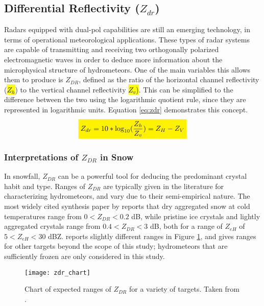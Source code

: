 \subsection{Differential Reflectivity ($Z_{dr}$)}
Radars equipped with dual-pol capabilities are still an emerging technology, in terms of operational meteorological applications. These
types of radar systems are capable of transmitting and receiving two orthogonally polarized electromagnetic waves in order to deduce more information about
the microphysical structure of hydrometeors. One of the main variables this allows them to produce is $Z_{DR}$, defined as the ratio of the horizontal
channel reflectivity (\hl{$Z_h$}) to the vertical channel reflectivity \hl{$Z_{v}$)}. This can be simplified to the difference between the two using the
logarithmic
quotient rule, since they are represented in logarithmic units. Equation \ref{eq:zdr} demonstrates this concept.
\begin{equation}\label{eq:zdr}
\mathcolorbox{yellow}{Z_{dr} = 10 * \log_{10}(\frac{Z_h}{Z_v}) = Z_H - Z_V}
\end{equation}
\subsubsection{Interpretations of $Z_{DR}$ in Snow}
In snowfall, $Z_{DR}$ can be a powerful tool for deducing the predominant crystal habit and type. Ranges of $Z_{DR}$ are typically given in the literature for characterizing hydrometeors, and vary due to their semi-empirical nature. The most widely cited synthesis paper by \citet{Straka2000} reports that dry aggregated snow at cold temperatures range from $0 < Z_{DR} < 0.2$ dB, while pristine ice crystals and lightly aggregated crystals range from $0.4 < Z_{DR} < 3$ dB, both for a range of $Z_{eH}$ of $5 < Z_{eH} < 30$ dBZ. \citet{Fabry2015} reports slightly different ranges in Figure \ref{zdr_chart}, and gives ranges for other targets beyond the scope of this study; hydrometeors that are sufficiently frozen are only considered in this study.
\begin{figure}[H]
\texttt{[image: zdr\_chart]}
\caption{Chart of expected ranges of $Z_{DR}$ for a variety of targets. Taken from \citet{Fabry2015}.} 
\label{zdr_chart}
\end{figure}
